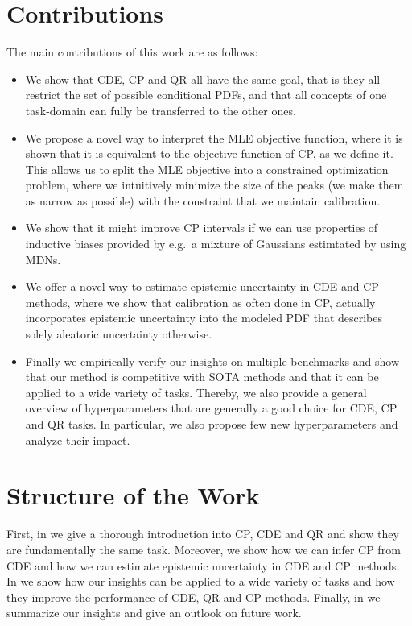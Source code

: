 \section{Contributions}\label{sec:contributions}

The main contributions of this work are as follows:

\begin{itemize}
    \item We show that CDE, CP and QR all have the same goal, that is they all restrict the set of possible conditional PDFs, and that all concepts of one task-domain can fully be transferred to the other ones.
    \item We propose a novel way to interpret the MLE objective function, where it is shown that it is equivalent to the objective function of CP, as we define it. This allows us to split the MLE objective into a constrained optimization problem, where we intuitively minimize the size of the peaks (we make them as narrow as possible) with the constraint that we maintain calibration.
    \item We show that it might improve CP intervals if we can use properties of inductive biases provided by e.g.\ a mixture of Gaussians estimtated by using MDNs.
    \item We offer a novel way to estimate epistemic uncertainty in CDE and CP methods, where we show that calibration as often done in CP, actually incorporates epistemic uncertainty into the modeled PDF that describes solely aleatoric uncertainty otherwise.
    \item Finally we empirically verify our insights on multiple benchmarks and show that our method is competitive with SOTA methods and that it can be applied to a wide variety of tasks. Thereby, we also provide a general overview of hyperparameters that are generally a good choice for CDE, CP and QR tasks. In particular, we also propose few new hyperparameters and analyze their impact.
\end{itemize}

\section{Structure of the Work}\label{sec:structure}

First, in  we give a thorough introduction into CP, CDE and QR and show they are fundamentally the same task. Moreover, we show how we can infer CP from CDE and how we can estimate epistemic uncertainty in CDE and CP methods. In  we show how our insights can be applied to a wide variety of tasks and how they improve the performance of CDE, QR and CP methods. Finally, in  we summarize our insights and give an outlook on future work.

